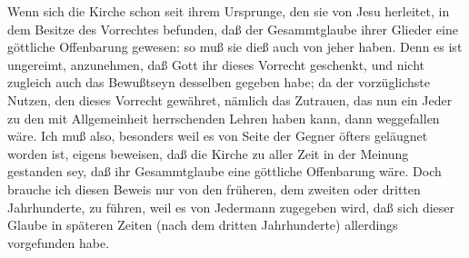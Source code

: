 Wenn sich die Kirche schon seit ihrem Ursprunge, den sie von Jesu herleitet, in dem Besitze des Vorrechtes befunden, daß der Gesammtglaube ihrer Glieder eine göttliche Offenbarung gewesen: so muß sie dieß auch von jeher  haben. Denn es ist ungereimt, anzunehmen, daß Gott ihr dieses Vorrecht geschenkt, und nicht zugleich auch das Bewußtseyn desselben gegeben habe; da der vorzüglichste Nutzen, den dieses Vorrecht gewähret, nämlich das Zutrauen, das nun ein Jeder zu den mit Allgemeinheit herrschenden Lehren haben kann, dann weggefallen wäre. Ich muß also, besonders weil es von Seite der Gegner öfters geläugnet worden ist, eigens beweisen, daß die Kirche zu aller Zeit in der Meinung gestanden sey, daß ihr Gesammtglaube eine göttliche Offenbarung wäre. Doch brauche ich diesen Beweis nur von den früheren, dem zweiten oder dritten Jahrhunderte, zu führen, weil es von Jedermann zugegeben wird, daß sich dieser Glaube in späteren Zeiten (nach dem dritten Jahrhunderte) allerdings vorgefunden habe.
